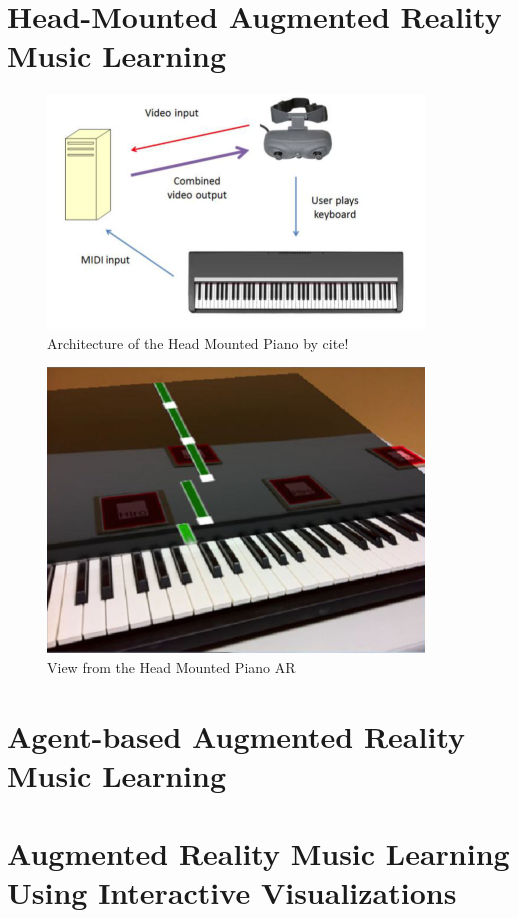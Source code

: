 \documentclass{article}
\begin{document}
\section{Head-Mounted Augmented Reality Music Learning}

\begin{figure}
    \centering
    \includegraphics[width=10cm]{figures/headmountedpiano1.png}
    \caption{Architecture of the Head Mounted Piano by cite! }
    \label{fig:pianoheadmountedarch}
\end{figure}

\begin{figure}
    \centering
    \includegraphics[width=10cm]{figures/headmountedview.png}
    \caption{View from the Head Mounted Piano AR  }
    \label{fig:View from the HeadMounted}
\end{figure}


\section{Agent-based Augmented Reality Music Learning}


\section{Augmented Reality Music Learning Using Interactive Visualizations}
\end{document}
